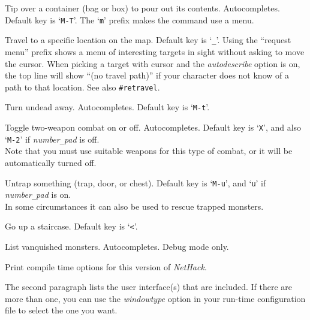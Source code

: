 Tip over a container (bag or box) to pour out its contents.
Autocompletes. Default key is `{\tt M-T}'.
The `{\tt m}' prefix makes the command use a menu.
\item[\tb{\#travel}]
Travel to a specific location on the map.
Default key is `{\tt \verb+_+}'.
Using the ``request menu'' prefix shows a menu of interesting targets in sight
without asking to move the cursor.
When picking a target with cursor and the {\it autodescribe\/}
option is on, the top line will show ``(no travel path)'' if
your character does not know of a path to that location.
See also {\tt \#retravel}.
\item[\tb{\#turn}]
Turn undead away. Autocompletes. Default key is `{\tt M-t}'.
\item[\tb{\#twoweapon}]
Toggle two-weapon combat on or off. Autocompletes.
Default key is `{\tt X}',
and also `{\tt M-2}' if {\it number\verb+_+pad\/} is off.\\
Note that you must
use suitable weapons for this type of combat, or it will
be automatically turned off.
\item[\tb{\#untrap}]
Untrap something (trap, door, or chest).
Default key is `{\tt M-u}', and `{\tt u}' if {\it number\verb+_+pad\/} is on.\\
In some circumstances it can also be used to rescue trapped monsters.
\item[\tb{\#up}]
Go up a staircase. Default key is `{\tt <}'.
\item[\tb{\#vanquished}]
List vanquished monsters.
Autocompletes.
Debug mode only.
\item[\tb{\#version}]
Print compile time options for this version of {\it NetHack\/}.

The second paragraph lists the user interface(s) that are included.
If there are more than one, you can use the {\it windowtype\/}
option in your run-time configuration file to select the one you want.

